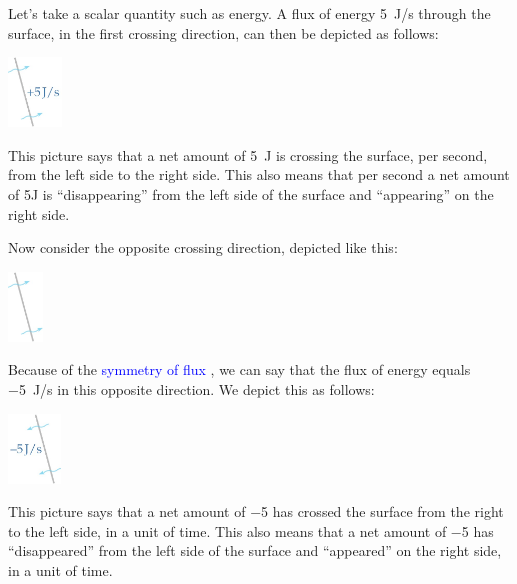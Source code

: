 \documentclass[a4paper,12pt,%
onecolumn,oneside,%
british%
]{memoir}
\renewcommand*{\|}[1][]{\nonscript\:#1\vert\nonscript\:\mathopen{}}
\newcommand*{\sect}{\S}%
\renewcommand*{\autoref}[3][\sect\,\ref]{\textcolor{blue}{#3}
\raisebox{0.6ex}{\color{blue}\miniscule%
\faIcon{angle-right}%
\;#1{#2}\;p.\,\pageref{#2}}}
\begin{document}
Let's take a scalar quantity such as energy. A flux of energy \qty{+5}{J/s} through the surface, in the first crossing direction, can then be depicted as follows:\noprelistbreak
\begin{center}
  \medskip
  \includegraphics[height=5em]{images/flux_plus5J.jpg}
\end{center}
This picture says that a net amount of \qty{5}{J} is crossing the surface, per second, from the left side to the right side. This also means that per second a net amount of \num{5}{J} is \enquote{disappearing} from the left side of the surface and \enquote{appearing} on the right side.

\medskip

Now consider the opposite crossing direction, depicted like this:\noprelistbreak
\begin{center}
  \medskip
  \includegraphics[height=5em]{images/inv_surface_tilted_crossing.jpg}
\end{center}
Because of the \autoref{def:symmetryflux}{symmetry of flux}, we can say that the flux of energy equals \qty{-5}{J/s} in this opposite direction. We depict this as follows:\noprelistbreak
\begin{center}
  \medskip
  \includegraphics[height=5em]{images/inv_flux_plus5J.jpg}
\end{center}
This picture says that a net amount of \num{-5} has crossed the surface from the right to the left side, in a unit of time. This also means that a net amount of \num{-5} has \enquote{disappeared} from the left side of the surface and \enquote{appeared} on the right side, in a unit of time.
\end{document}
